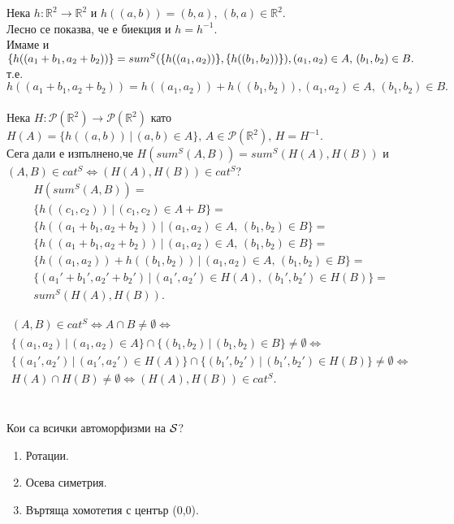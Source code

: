 \documentclass[12pt]{article}
\begin{document}
\begin{addmargin}[1em]{2em}
Нека $h:\mathbb{R}^2 \rightarrow \mathbb{R}^2$ и 
$h((a,b)) = (b,a),\, (b,a) \in \mathbb{R}^2$.\\
Лесно се показва, че е биекция и $h=h^{-1}$.\\
Имаме и $\{h((a_{1} + b_{1},a_{2} + b_{2}))\} = sum^S(\{h((a_{1}, a_{2}))\},\{h((b_{1}, b_{2}))\}),\\ (a_{1}, a_{2})\in A,\,(b_{1}, b_{2})\in B.$ т.е. \\$h((a_{1} + b_{1},a_{2} + b_{2})) = h((a_{1}, a_{2})) + h((b_{1}, b_{2})), (a_{1}, a_{2})\in A,\,(b_{1}, b_{2})\in B.$\\\\
Нека $H:\mathcal{P}(\mathbb{R}^2)\rightarrow \mathcal{P}(\mathbb{R}^2)$ като $H(A) = \{h((a,b))\,|\,(a,b) \in A\},\,A \in \mathcal{P}(\mathbb{R}^2),\, H = H^{-1}$.\\
Сега дали е изпълнено,че $H(sum^S(A,B)) = sum^S(H(A),H(B))$ и $(A,B) \in cat^S \iff (H(A), H(B)) \in cat^S$?\\
\begin{eqnarray*}
    H(sum^S(A,B)) =\\
    \{h((c_{1},c_{2}))\,|\,(c_{1},c_{2})\in A+B\}=\\
    \{h((a_{1} + b_{1},a_{2} + b_{2}))\,|\,(a_{1}, a_{2})\in A,\,(b_{1}, b_{2})\in B\}=\\
    \{h((a_{1} + b_{1},a_{2} + b_{2}))\,|\,(a_{1}, a_{2})\in A,\,(b_{1}, b_{2})\in B\}=\\
    \{h((a_{1}, a_{2})) + h((b_{1}, b_{2}))\,|\,(a_{1}, a_{2})\in A,\,(b_{1}, b_{2})\in B\}=\\
    \{(a_{1}' + b_{1}',a_{2}' + b_{2}')\,|\,(a_{1}', a_{2}')\in H(A),\,(b_{1}', b_{2}')\in H(B)\}=\\
    sum^S(H(A),H(B)).
\end{eqnarray*}

\begin{eqnarray*}
    (A,B) \in cat^S \iff A \cap B \neq \emptyset \iff \\
    \{(a_{1},a_{2})\,|\,(a_{1},a_{2}) \in A\} \cap \{(b_{1},b_{2})\,|\,(b_{1},b_{2}) \in B\} \neq \emptyset \iff \\
    \{(a_{1}',a_{2}')\,|\,(a_{1}',a_{2}') \in H(A)\} \cap \{(b_{1}',b_{2}')\,|\,(b_{1}',b_{2}') \in H(B)\} \neq \emptyset \iff \\
    H(A) \cap H(B) \neq \emptyset \iff (H(A),H(B)) \in cat^S.
\end{eqnarray*}
\\\\
Кои са всички автоморфизми на $\cal{S}$?
\begin{enumerate}
    \item Ротации.
    \item Осева симетрия.
    \item Въртяща хомотетия с център (0,0).
\end{enumerate}
\end{addmargin}
\end{document}
